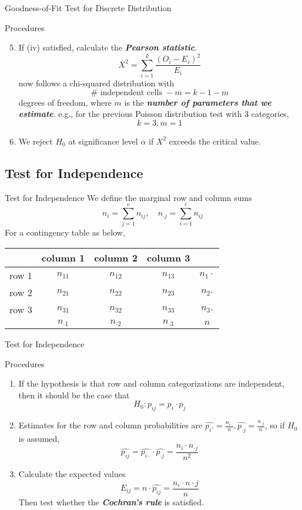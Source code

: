 \documentclass{beamer}
\newcommand{\bb}[1]{\textcolor{antiquefuchsia}{\textbf{\textit{#1}}}}
\begin{document}
\begin{frame}{Goodness-of-Fit Test for Discrete Distribution}
\begin{block}{Procedures}
\begin{enumerate}
\setcounter{enumi}{4}
\item If (iv) satisfied, calculate the \bb{Pearson statistic}.
$$
X^{2}=\sum_{i=1}^{k} \frac{\left(O_{i}-E_{i}\right)^{2}}{E_{i}}
$$
now follows a chi-squared distribution with
$$\#\text{ independent cells }-m=k-1-m$$
degrees of freedom, where $m$ is the \bb{number of parameters that we estimate}. e.g., for the previous Poisson distribution test with 3 categories,
$$
k=3, m=1
$$
\item We reject $H_{0}$ at significance level $\alpha$ if $X^{2}$ exceeds the critical value.
\end{enumerate}
\end{block}
\end{frame}

\subsection{Test for Independence}

\begin{frame}{Test for Independence}
We define the marginal row and column sums
$$
n_{i}=\sum_{j=1}^{c} n_{i j}, \quad n_{\cdot j}=\sum_{i=1}^{r} n_{i j}
$$
For a contingency table as below,
\begin{center}
\begin{tabular}{l|ccc|c} 
& column 1 & column 2 & column 3 & \\
\hline row 1 & $n_{11}$ & $n_{12}$ & $n_{13}$ & $n_{1} \cdot$ \\
row 2 & $n_{21}$ & $n_{22}$ & $n_{23}$ & $n_{2} .$ \\
row 3 & $n_{31}$ & $n_{32}$ & $n_{33}$ & $n_{3} .$ \\
\hline & $n_{\cdot 1}$ & $n_{\cdot 2}$ & $n_{\cdot 3}$ & $n$
\end{tabular}
\end{center}
\end{frame}

\begin{frame}{Test for Independence}
\begin{block}{Procedures}
\begin{enumerate}
\item If the hypothesis is that row and column categorizations are independent, then it should be the case that
$$
H_{0}: p_{i j}=p_{i} \cdot p_{j}
$$
\item Estimates for the row and column probabilities are $\widehat{p_{i} .}=\frac{n_{i \cdot}}{n}, \widehat{p_{\cdot j}}=\frac{n_{\cdot j}}{n}$, so if $H_{0}$ is assumed,
$$
\widehat{p_{i j}}=\widehat{p_{i \cdot}} \cdot \widehat{p_{\cdot j}}=\frac{n_{i} \cdot n_{\cdot j}}{n^{2}}
$$
\item Calculate the expected values
$$
E_{i j}=n \cdot \widehat{p_{i j}}=\frac{n_{i} \cdot n \cdot j}{n}
$$
Then test whether the \bb{Cochran's rule} is satisfied.
\end{enumerate}
\end{block}
\end{frame}
\end{document}
